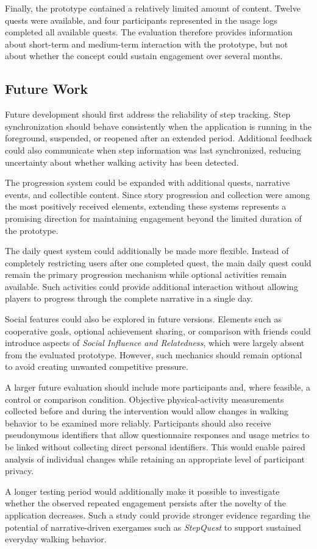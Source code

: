 Finally, the prototype contained a relatively limited amount of content. Twelve quests were available, and four participants represented in the usage logs completed all available quests. The evaluation therefore provides information about short-term and medium-term interaction with the prototype, but not about whether the concept could sustain engagement over several months.

\subsection{Future Work}

Future development should first address the reliability of step tracking. Step synchronization should behave consistently when the application is running in the foreground, suspended, or reopened after an extended period. Additional feedback could also communicate when step information was last synchronized, reducing uncertainty about whether walking activity has been detected.

The progression system could be expanded with additional quests, narrative events, and collectible content. Since story progression and collection were among the most positively received elements, extending these systems represents a promising direction for maintaining engagement beyond the limited duration of the prototype.

The daily quest system could additionally be made more flexible. Instead of completely restricting users after one completed quest, the main daily quest could remain the primary progression mechanism while optional activities remain available. Such activities could provide additional interaction without allowing players to progress through the complete narrative in a single day.

Social features could also be explored in future versions. Elements such as cooperative goals, optional achievement sharing, or comparison with friends could introduce aspects of \textit{Social Influence and Relatedness}, which were largely absent from the evaluated prototype. However, such mechanics should remain optional to avoid creating unwanted competitive pressure.

A larger future evaluation should include more participants and, where feasible, a control or comparison condition. Objective physical-activity measurements collected before and during the intervention would allow changes in walking behavior to be examined more reliably. Participants should also receive pseudonymous identifiers that allow questionnaire responses and usage metrics to be linked without collecting direct personal identifiers. This would enable paired analysis of individual changes while retaining an appropriate level of participant privacy.

A longer testing period would additionally make it possible to investigate whether the observed repeated engagement persists after the novelty of the application decreases. Such a study could provide stronger evidence regarding the potential of narrative-driven exergames such as \textit{StepQuest} to support sustained everyday walking behavior.